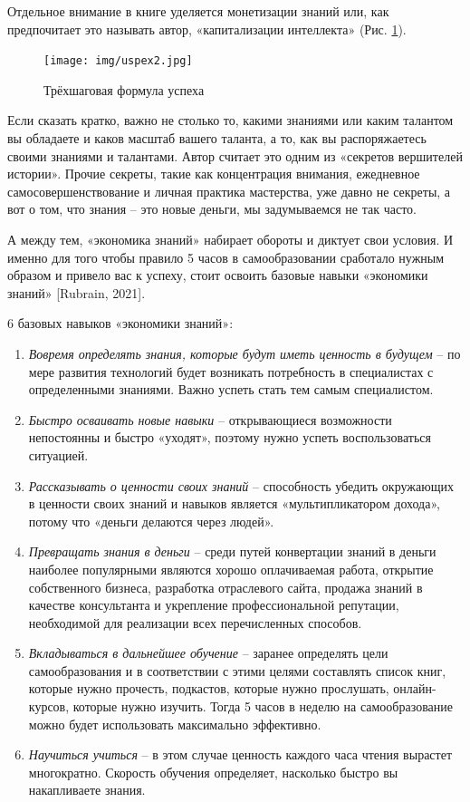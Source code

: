 Отдельное внимание в книге уделяется монетизации знаний или, как предпочитает это называть автор, «капитализации интеллекта» (Рис. \ref{fig:uspex2}).
\begin{figure}[h]
    \centering
    \texttt{[image: img/uspex2.jpg]}
    \caption{Трёхшаговая формула успеха}
    \label{fig:uspex2}
\end{figure}

Если сказать кратко, важно не столько то, какими знаниями или каким талантом вы обладаете и каков масштаб вашего таланта, а то, как вы распоряжаетесь своими знаниями и талантами. Автор считает это одним из «секретов вершителей истории». Прочие секреты, такие как концентрация внимания, ежедневное самосовершенствование и личная практика мастерства, уже давно не секреты, а вот о том, что знания – это новые деньги, мы задумываемся не так часто.

А между тем, «экономика знаний» набирает обороты и диктует свои условия. И именно для того чтобы правило 5 часов в самообразовании сработало нужным образом и привело вас к успеху, стоит освоить базовые навыки «экономики знаний» [Rubrain, 2021].

6 базовых навыков «экономики знаний»:
\begin{enumerate}
    \item \textit{Вовремя определять знания, которые будут иметь ценность в будущем} – по мере развития технологий будет возникать потребность в специалистах с определенными знаниями. Важно успеть стать тем самым специалистом.
    \item \textit{Быстро осваивать новые навыки} – открывающиеся возможности непостоянны и быстро «уходят», поэтому нужно успеть воспользоваться ситуацией.
    \item \textit{Рассказывать о ценности своих знаний} – способность убедить окружающих в ценности своих знаний и навыков является «мультипликатором дохода», потому что «деньги делаются через людей».
    \item \textit{Превращать знания в деньги} – среди путей конвертации знаний в деньги наиболее популярными являются хорошо оплачиваемая работа, открытие собственного бизнеса, разработка отраслевого сайта, продажа знаний в качестве консультанта и укрепление профессиональной репутации, необходимой для реализации всех перечисленных способов.
    \item \textit{Вкладываться в дальнейшее обучение} – заранее определять цели самообразования и в соответствии с этими целями составлять список книг, которые нужно прочесть, подкастов, которые нужно прослушать, онлайн-курсов, которые нужно изучить. Тогда 5 часов в неделю на самообразование можно будет использовать максимально эффективно.
    \item \textit{Научиться учиться} – в этом случае ценность каждого часа чтения вырастет многократно. Скорость обучения определяет, насколько быстро вы накапливаете знания.
\end{enumerate}

